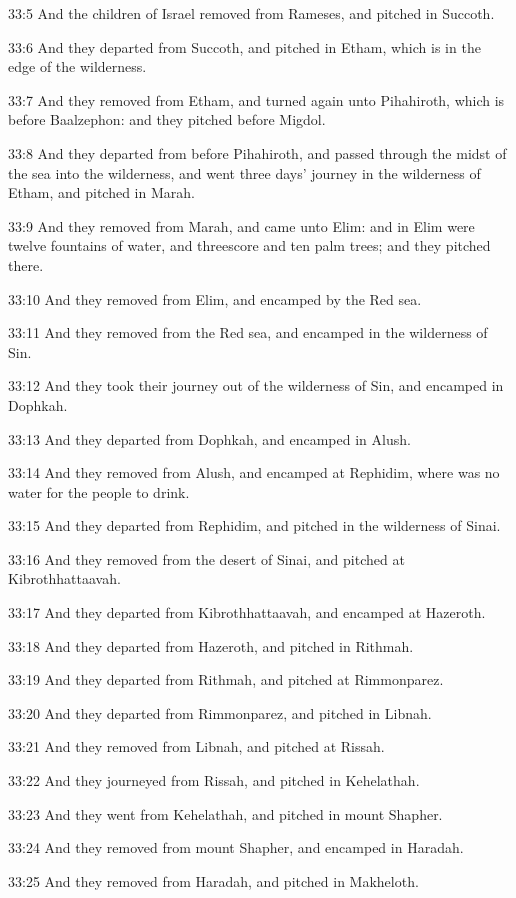 33:5 And the children of Israel removed from Rameses, and pitched in
Succoth.

33:6 And they departed from Succoth, and pitched in Etham, which is in
the edge of the wilderness.

33:7 And they removed from Etham, and turned again unto Pihahiroth,
which is before Baalzephon: and they pitched before Migdol.

33:8 And they departed from before Pihahiroth, and passed through the
midst of the sea into the wilderness, and went three days' journey in
the wilderness of Etham, and pitched in Marah.

33:9 And they removed from Marah, and came unto Elim: and in Elim were
twelve fountains of water, and threescore and ten palm trees; and they
pitched there.

33:10 And they removed from Elim, and encamped by the Red sea.

33:11 And they removed from the Red sea, and encamped in the
wilderness of Sin.

33:12 And they took their journey out of the wilderness of Sin, and
encamped in Dophkah.

33:13 And they departed from Dophkah, and encamped in Alush.

33:14 And they removed from Alush, and encamped at Rephidim, where was
no water for the people to drink.

33:15 And they departed from Rephidim, and pitched in the wilderness
of Sinai.

33:16 And they removed from the desert of Sinai, and pitched at
Kibrothhattaavah.

33:17 And they departed from Kibrothhattaavah, and encamped at
Hazeroth.

33:18 And they departed from Hazeroth, and pitched in Rithmah.

33:19 And they departed from Rithmah, and pitched at Rimmonparez.

33:20 And they departed from Rimmonparez, and pitched in Libnah.

33:21 And they removed from Libnah, and pitched at Rissah.

33:22 And they journeyed from Rissah, and pitched in Kehelathah.

33:23 And they went from Kehelathah, and pitched in mount Shapher.

33:24 And they removed from mount Shapher, and encamped in Haradah.

33:25 And they removed from Haradah, and pitched in Makheloth.

